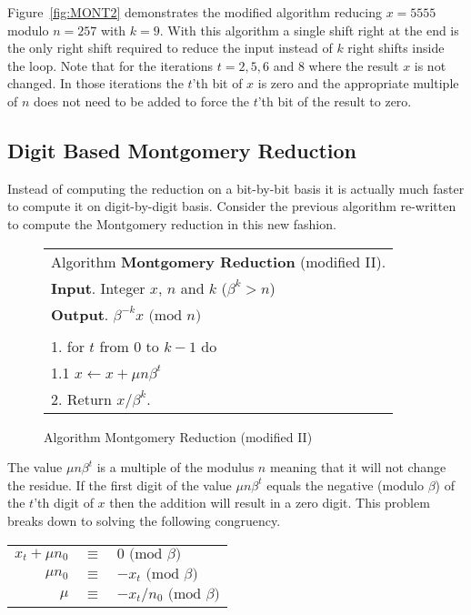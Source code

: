 \documentclass[b5paper]{book}
\begin{document}
Figure~\ref{fig:MONT2} demonstrates the modified algorithm reducing $x = 5555$ modulo $n = 257$ with $k = 9$. 
With this algorithm a single shift right at the end is the only right shift required to reduce the input instead of $k$ right shifts inside the 
loop.  Note that for the iterations $t = 2, 5, 6$ and $8$ where the result $x$ is not changed.  In those iterations the $t$'th bit of $x$ is 
zero and the appropriate multiple of $n$ does not need to be added to force the $t$'th bit of the result to zero.  

\subsection{Digit Based Montgomery Reduction}
Instead of computing the reduction on a bit-by-bit basis it is actually much faster to compute it on digit-by-digit basis.  Consider the
previous algorithm re-written to compute the Montgomery reduction in this new fashion.

\begin{figure}[!here]
\begin{small}
\begin{center}
\begin{tabular}{l}
\hline Algorithm \textbf{Montgomery Reduction} (modified II). \\
\textbf{Input}.   Integer $x$, $n$ and $k$ ($\beta^k > n$) \\
\textbf{Output}.  $\beta^{-k}x \mbox{ (mod }n\mbox{)}$ \\
\hline \\
1.  for $t$ from $0$ to $k - 1$ do \\
\hspace{3mm}1.1  $x \leftarrow x + \mu n \beta^t$ \\
2.  Return $x/\beta^k$. \\
\hline
\end{tabular}
\end{center}
\end{small}
\caption{Algorithm Montgomery Reduction (modified II)}
\end{figure}

The value $\mu n \beta^t$ is a multiple of the modulus $n$ meaning that it will not change the residue.  If the first digit of 
the value $\mu n \beta^t$ equals the negative (modulo $\beta$) of the $t$'th digit of $x$ then the addition will result in a zero digit.  This
problem breaks down to solving the following congruency.  

\begin{center}
\begin{tabular}{rcl}
$x_t + \mu n_0$ & $\equiv$ & $0 \mbox{ (mod }\beta\mbox{)}$ \\
$\mu n_0$ & $\equiv$ & $-x_t \mbox{ (mod }\beta\mbox{)}$ \\
$\mu$ & $\equiv$ & $-x_t/n_0 \mbox{ (mod }\beta\mbox{)}$ \\
\end{tabular}
\end{center}
\end{document}
